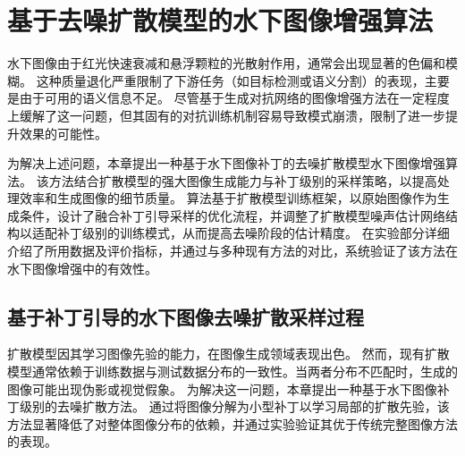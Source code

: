 
\chapter{基于去噪扩散模型的水下图像增强算法}
水下图像由于红光快速衰减和悬浮颗粒的光散射作用，通常会出现显著的色偏和模糊。
这种质量退化严重限制了下游任务（如目标检测或语义分割）的表现，主要是由于可用的语义信息不足。
尽管基于生成对抗网络的图像增强方法在一定程度上缓解了这一问题，但其固有的对抗训练机制容易导致模式崩溃，限制了进一步提升效果的可能性。

为解决上述问题，本章提出一种基于水下图像补丁的去噪扩散模型水下图像增强算法。
该方法结合扩散模型的强大图像生成能力与补丁级别的采样策略，以提高处理效率和生成图像的细节质量。
算法基于扩散模型训练框架，以原始图像作为生成条件，设计了融合补丁引导采样的优化流程，并调整了扩散模型噪声估计网络结构以适配补丁级别的训练模式，从而提高去噪阶段的估计精度。
在实验部分详细介绍了所用数据及评价指标，并通过与多种现有方法的对比，系统验证了该方法在水下图像增强中的有效性。



\section{基于补丁引导的水下图像去噪扩散采样过程}
扩散模型因其学习图像先验的能力，在图像生成领域表现出色。
然而，现有扩散模型通常依赖于训练数据与测试数据分布的一致性。当两者分布不匹配时，生成的图像可能出现伪影或视觉假象。
为解决这一问题，本章提出一种基于水下图像补丁级别的去噪扩散方法。
通过将图像分解为小型补丁以学习局部的扩散先验，该方法显著降低了对整体图像分布的依赖，并通过实验验证其优于传统完整图像方法的表现。

